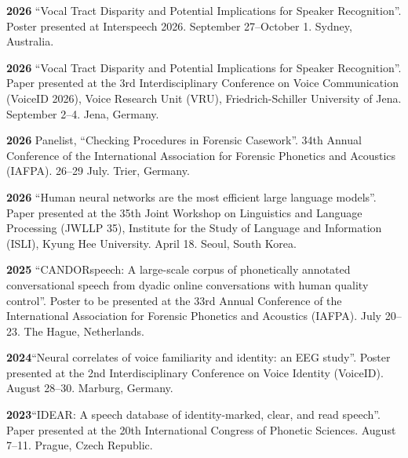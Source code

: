 \documentclass[11pt]{article}
\newcommand{\hangpara}{
 \setlength{\parindent}{0in} %
 \hangindent=0.42in %
}
\begin{document}
\vskip 6pt
\hangpara
{\bf 2026}\hspace{1ex} “Vocal Tract Disparity and Potential Implications for Speaker Recognition”. Poster presented at Interspeech 2026. September 27--October 1. Sydney, Australia.

\vskip 6pt
\hangpara
{\bf 2026}\hspace{1ex} “Vocal Tract Disparity and Potential Implications for Speaker Recognition”. Paper presented at the 3rd Interdisciplinary Conference on Voice Communication (VoiceID 2026), Voice Research Unit (VRU), Friedrich-Schiller University of Jena. September 2--4. Jena, Germany.

\vskip 6pt
\hangpara
{\bf 2026}\hspace{1ex} Panelist, “Checking Procedures in Forensic Casework”. 34th Annual Conference of the International Association for Forensic Phonetics and Acoustics (IAFPA). 26--29 July. Trier, Germany.

\vskip 6pt
\hangpara
{\bf 2026}\hspace{1ex} “Human neural networks are the most efficient large language models”. Paper presented at the 35th Joint Workshop on Linguistics and Language Processing (JWLLP 35), Institute for the Study of Language and Information (ISLI), Kyung Hee University. April 18. Seoul, South Korea.

\vskip 6pt
\hangpara
{\bf 2025}\hspace{1ex} “CANDORspeech: A large-scale corpus of phonetically annotated conversational speech from dyadic online conversations with human quality control”. Poster to be presented at the 33rd Annual Conference of the International Association for Forensic Phonetics and Acoustics (IAFPA). July 20--23. The Hague, Netherlands.


\vskip 6pt
\hangpara
{\bf 2024}\hspace{1ex}“Neural correlates of voice familiarity and identity: an EEG study”. Poster presented at the 2nd Interdisciplinary Conference on Voice Identity (VoiceID). August 28--30. Marburg, Germany.


\vskip 6pt
\hangpara
{\bf 2023}\hspace{1ex}“IDEAR: A speech database of identity-marked, clear, and read speech”. Paper presented at the 20th International Congress of Phonetic Sciences. August 7--11. Prague, Czech Republic.
\end{document}
